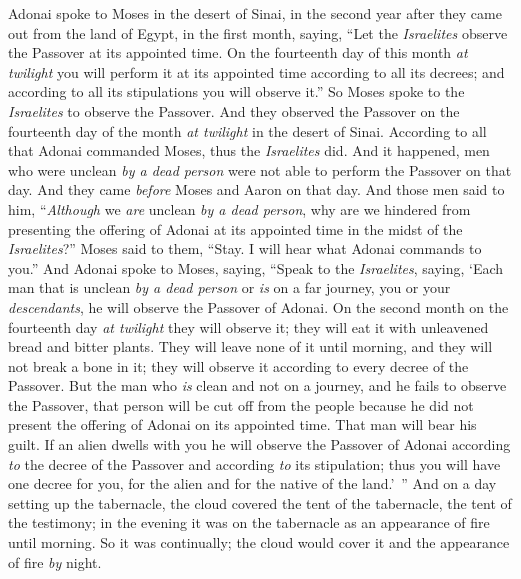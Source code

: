 \begin{biblechapter} %
 Adonai spoke to Moses in the desert of Sinai, in the second year after they came out from the land of Egypt, in the first month, saying,
\verse “Let the \textit{Israelites} observe the Passover at its appointed time.
\verse On the fourteenth day of this month \textit{at twilight} you will perform it at its appointed time according to all its decrees; and according to all its stipulations you will observe it.”
\verse So Moses spoke to the \textit{Israelites} to observe the Passover.
\verse And they observed the Passover on the fourteenth day of the month \textit{at twilight} in the desert of Sinai. According to all that Adonai commanded Moses, thus the \textit{Israelites} did.
\verse And it happened, men who were unclean \textit{by a dead person} were not able to perform the Passover on that day. And they came \textit{before} Moses and Aaron on that day.
\verse And those men said to him, “\textit{Although} we \textit{are} unclean \textit{by a dead person}, why are we hindered from presenting the offering of Adonai at its appointed time in the midst of the \textit{Israelites}?”
\verse Moses said to them, “Stay. I will hear what Adonai commands to you.”
\verse And Adonai spoke to Moses, saying,
\verse “Speak to the \textit{Israelites}, saying, ‘Each man that is unclean \textit{by a dead person} or \textit{is} on a far journey, you or your \textit{descendants}, he will observe the Passover of Adonai.
\verse On the second month on the fourteenth day \textit{at twilight} they will observe it; they will eat it with unleavened bread and bitter plants.
\verse They will leave none of it until morning, and they will not break a bone in it; they will observe it according to every decree of the Passover.
\verse But the man who \textit{is} clean and not on a journey, and he fails to observe the Passover, that person will be cut off from the people because he did not present the offering of Adonai on its appointed time. That man will bear his guilt.
\verse If an alien dwells with you he will observe the Passover of Adonai according \textit{to} the decree of the Passover and according \textit{to} its stipulation; thus you will have one decree for you, for the alien and for the native of the land.’ ”
 And on a day setting up the tabernacle, the cloud covered the tent of the tabernacle, the tent of the testimony; in the evening it was on the tabernacle as an appearance of fire until morning.
\verse So it was continually; the cloud would cover it and the appearance of fire \textit{by} night.

\end{biblechapter}
